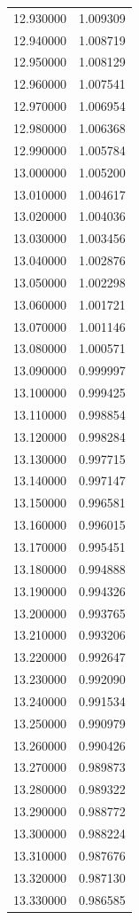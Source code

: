 \begin{tabular}{rr}
12.930000 & 1.009309 \\
12.940000 & 1.008719 \\
12.950000 & 1.008129 \\
12.960000 & 1.007541 \\
12.970000 & 1.006954 \\
12.980000 & 1.006368 \\
12.990000 & 1.005784 \\
13.000000 & 1.005200 \\
13.010000 & 1.004617 \\
13.020000 & 1.004036 \\
13.030000 & 1.003456 \\
13.040000 & 1.002876 \\
13.050000 & 1.002298 \\
13.060000 & 1.001721 \\
13.070000 & 1.001146 \\
13.080000 & 1.000571 \\
13.090000 & 0.999997 \\
13.100000 & 0.999425 \\
13.110000 & 0.998854 \\
13.120000 & 0.998284 \\
13.130000 & 0.997715 \\
13.140000 & 0.997147 \\
13.150000 & 0.996581 \\
13.160000 & 0.996015 \\
13.170000 & 0.995451 \\
13.180000 & 0.994888 \\
13.190000 & 0.994326 \\
13.200000 & 0.993765 \\
13.210000 & 0.993206 \\
13.220000 & 0.992647 \\
13.230000 & 0.992090 \\
13.240000 & 0.991534 \\
13.250000 & 0.990979 \\
13.260000 & 0.990426 \\
13.270000 & 0.989873 \\
13.280000 & 0.989322 \\
13.290000 & 0.988772 \\
13.300000 & 0.988224 \\
13.310000 & 0.987676 \\
13.320000 & 0.987130 \\
13.330000 & 0.986585 \\

\end{tabular}
